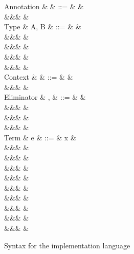 \begin{figure}
\begin{syntaxfig}
\mbox{Annotation}
&
\alpha
&
::=
&
\true
&
\\
&&&
\false
&
\\[2mm]
\mbox{Type}
&
A, B
&
::=
&
\tyBool
&
\\
&&&
\tyInt
&
\\
&&&
\tyList
&
\\
&&&
&
\\
&&&
&
\\[2mm]
\mbox{Context}
&
\Gamma
&
::=
&
\cxtEmpty
&
\\
&&&
&
\\[2mm]
\mbox{Eliminator}
&
\sigma, \tau
&
::=
&
&
\\
&&&
&
\\
&&&
&
\\
&&&
&
\\[2mm]
\mbox{Term}
&
e
&
::=
&
x
&
\\
&&&
\annot{\exTrue}{\alpha} \mid \annot{\exFalse}{\alpha}
&
\\
&&&
&
\\
&&&
&
\\
&&&
&
\\
&&&
&
\\
&&&
&
\\
&&&
\annot{\exNil}{\alpha}
&
\\
&&&
&
\\
&&&
&
\end{syntaxfig}
\caption{Syntax for the implementation language}
\label{fig:impl-language:syntax}
\end{figure}
